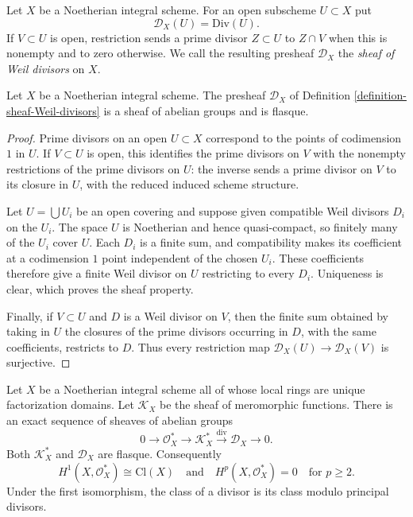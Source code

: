 \begin{definition}
\label{definition-sheaf-Weil-divisors}
Let $X$ be a Noetherian integral scheme. For an open subscheme $U\subset X$
put
$$
\mathcal{D}_X(U)=\text{Div}(U).
$$
If $V\subset U$ is open, restriction sends a prime divisor $Z\subset U$
to $Z\cap V$ when this is nonempty and to zero otherwise. We call the
resulting presheaf $\mathcal{D}_X$ the \emph{sheaf of Weil divisors} on $X$.
\end{definition}

\begin{lemma}
\label{lemma-sheaf-Weil-divisors-flasque}
Let $X$ be a Noetherian integral scheme. The presheaf
$\mathcal{D}_X$ of Definition \ref{definition-sheaf-Weil-divisors} is a
sheaf of abelian groups and is flasque.
\end{lemma}

\begin{proof}
Prime divisors on an open $U\subset X$ correspond to the points of
codimension $1$ in $U$. If $V\subset U$ is open, this identifies the prime
divisors on $V$ with the nonempty restrictions of the prime divisors on
$U$: the inverse sends a prime divisor on $V$ to its closure in $U$, with
the reduced induced scheme structure.

Let $U=\bigcup U_i$ be an open covering and suppose given compatible Weil
divisors $D_i$ on the $U_i$. The space $U$ is Noetherian and hence
quasi-compact, so finitely many of the $U_i$ cover $U$. Each $D_i$ is a
finite sum, and compatibility makes its coefficient at a codimension $1$
point independent of the chosen $U_i$. These coefficients therefore give
a finite Weil divisor on $U$ restricting to every $D_i$. Uniqueness is
clear, which proves the sheaf property.

Finally, if $V\subset U$ and $D$ is a Weil divisor on $V$, then the finite
sum obtained by taking in $U$ the closures of the prime divisors occurring
in $D$, with the same coefficients, restricts to $D$. Thus every
restriction map $\mathcal{D}_X(U)\to\mathcal{D}_X(V)$ is surjective.
\end{proof}

\begin{lemma}
\label{lemma-locally-UFD-divisor-resolution}
\begin{reference}
\cite[Chapter III, \S 3.4, p. 161]{Tohoku}
\end{reference}
Let $X$ be a Noetherian integral scheme all of whose local rings are
unique factorization domains. Let $\mathcal{K}_X$ be the sheaf of
meromorphic functions. There is an exact sequence of sheaves of abelian
groups
\begin{equation}
\label{equation-locally-UFD-divisor-resolution}
0\longrightarrow\mathcal{O}_X^*\longrightarrow\mathcal{K}_X^*
\xrightarrow{\operatorname{div}}\mathcal{D}_X\longrightarrow0.
\end{equation}
Both $\mathcal{K}_X^*$ and $\mathcal{D}_X$ are flasque. Consequently
$$
H^1(X,\mathcal{O}_X^*)\cong\text{Cl}(X)
\quad\text{and}\quad
H^p(X,\mathcal{O}_X^*)=0\quad\text{for }p\geq2.
$$
Under the first isomorphism, the class of a divisor is its class modulo
principal divisors.
\end{lemma}

